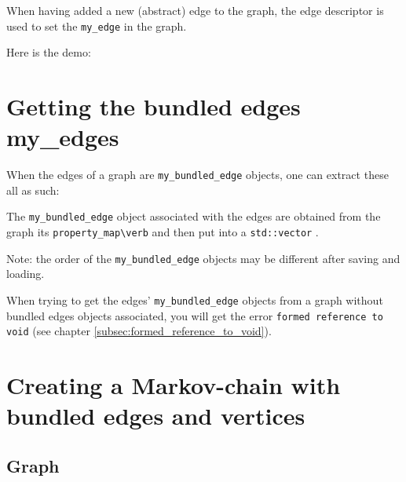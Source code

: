 

When having added a new (abstract) edge to the graph, the edge descriptor
is used to set the \verb;my_edge; in the graph.

Here is the demo:



\section{Getting the bundled edges my\_edges}
\label{subsec:get_bundled_edge_my_edges}

When the edges of a graph are \verb;my_bundled_edge; objects, 
one can extract these all as such:



The \verb;my_bundled_edge; object associated with the edges are obtained from
the graph its \verb;property_map\verb; and then put into a 
\verb;std::vector; .

Note: the order of the \verb;my_bundled_edge; objects may be different after saving
and loading.

When trying to get the edges' \verb;my_bundled_edge; objects from a graph without
bundled edges objects associated, you will get the error 
\verb;formed reference to void; (see chapter \ref{subsec:formed_reference_to_void}).

\section{Creating a Markov-chain with bundled edges and vertices}
\label{subsec:create_bundled_edges_and_vertices_markov_chain}

\subsection{Graph}

